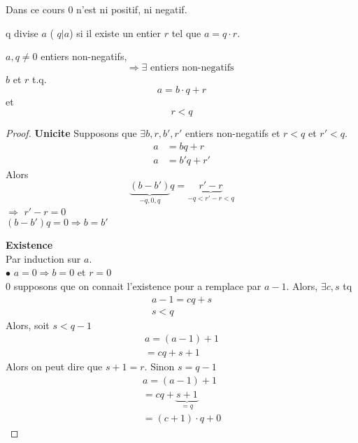 \documentclass[../main.tex]{subfiles}
\begin{document}
Dans ce cours $0$ n'est ni positif, ni negatif.

\begin{defn}\label{def:divison_dentiers}
	q divise $a$ ( $q \vert a$)
	si il existe un entier $r$ tel que $a=q\cdot r$.
\end{defn}
\begin{propo}\label{propo:division_avec_reste}
	$a, q \neq 0$ entiers non-negatifs, 
	\[ 
		\Rightarrow \exists \text{ entiers non-negatifs }
	\]
	$b$ et $r$ t.q.
	\[ 
	a=b\cdot q + r
	\]
	et 
	\[ 
	r < q
	\]
\end{propo}
\begin{proof}
	\textbf{Unicite}
	Supposons que $\exists b,r,b',r'$ entiers non-negatifs et $r<q$ et $r'<q$.
	\begin{align*}
	a &= b q + r\\
	a &= b' q + r'
	\end{align*}
	Alors
	\[ 
		\underbrace{ ( b-b')  }_{-q,0,q}q = \underbrace{ r'-r }_{-q < r'-r < q}
	\]
	$\Rightarrow$ $r' -r = 0$ \\
	$(b-b') q = 0 \Rightarrow b=b'$
	
	\textbf{Existence}\\
	Par induction sur $a$.\\
	$\bullet$ $a=0 \Rightarrow b=0$ et $r=0$\\
	$0$ supposons que on connait l'existence pour a remplace par $a-1$.
	Alors, $\exists c,s$ tq
	\begin{align*}
	a-1 = c q + s\\
	s<q
	\end{align*}
	Alors, soit $s<q-1$ 
	\begin{align*}
		a= ( a-1) + 1 \\
		= cq +s +1
	\end{align*}
	Alors on peut dire que $s+1=r$.
	Sinon $s=q-1$ \\
	\begin{align*}
		a= ( a-1) +1\\
		= cq +\underbrace{ s +1 }_{=q}\\
		= (c+1) \cdot q + 0
	\end{align*}
\end{proof}
\end{document}

